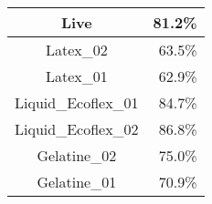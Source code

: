 \begin{tabular}{ c   r }
    Live                &  81.2\%  \\ \hline\hline
    Latex\_02           &  63.5\%  \\
    Latex\_01           &  62.9\%  \\
    Liquid\_Ecoflex\_01 &  84.7\%  \\
    Liquid\_Ecoflex\_02 &  86.8\%  \\
    Gelatine\_02        &  75.0\%  \\
    Gelatine\_01        &  70.9\%  \\
\end{tabular}